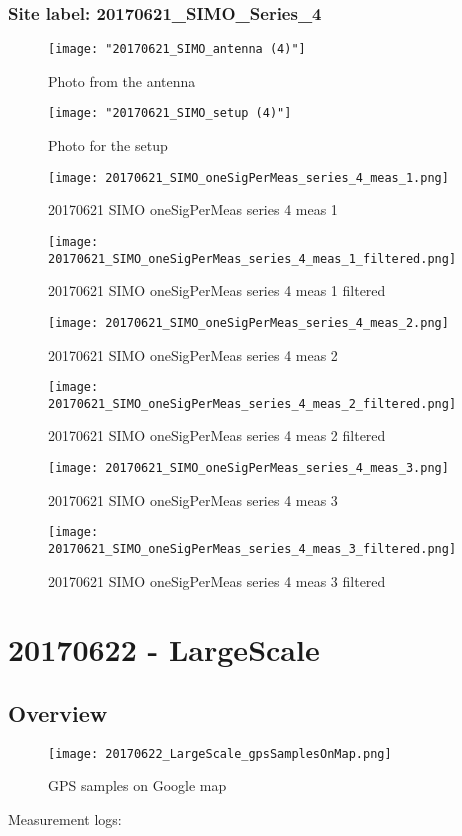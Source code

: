 \subsubsection{Site label: 20170621\_SIMO\_Series\_4}
\begin{figure}[ht] \caption{Photo from the antenna}
\texttt{[image: "20170621\_SIMO\_antenna (4)"]}\centering\end{figure}
\begin{figure}[ht] \caption{Photo for the setup}
\texttt{[image: "20170621\_SIMO\_setup (4)"]}\centering\end{figure}
\begin{figure}[ht] \caption{20170621 SIMO oneSigPerMeas series 4 meas 1}
\texttt{[image: 20170621\_SIMO\_oneSigPerMeas\_series\_4\_meas\_1.png]}\centering\end{figure}
\begin{figure}[ht] \caption{20170621 SIMO oneSigPerMeas series 4 meas 1 filtered}
\texttt{[image: 20170621\_SIMO\_oneSigPerMeas\_series\_4\_meas\_1\_filtered.png]}\centering\end{figure}
\begin{figure}[ht] \caption{20170621 SIMO oneSigPerMeas series 4 meas 2}
\texttt{[image: 20170621\_SIMO\_oneSigPerMeas\_series\_4\_meas\_2.png]}\centering\end{figure}
\begin{figure}[ht] \caption{20170621 SIMO oneSigPerMeas series 4 meas 2 filtered}
\texttt{[image: 20170621\_SIMO\_oneSigPerMeas\_series\_4\_meas\_2\_filtered.png]}\centering\end{figure}
\begin{figure}[ht] \caption{20170621 SIMO oneSigPerMeas series 4 meas 3}
\texttt{[image: 20170621\_SIMO\_oneSigPerMeas\_series\_4\_meas\_3.png]}\centering\end{figure}
\begin{figure}[ht] \caption{20170621 SIMO oneSigPerMeas series 4 meas 3 filtered}
\texttt{[image: 20170621\_SIMO\_oneSigPerMeas\_series\_4\_meas\_3\_filtered.png]}\centering\end{figure}
\clearpage
\section{20170622 - LargeScale}
\subsection{Overview}
\begin{figure}[ht] \caption{GPS samples on Google map}
\texttt{[image: 20170622\_LargeScale\_gpsSamplesOnMap.png]}\centering\end{figure}
\begin{minipage}{\textwidth} Measurement logs:

 \end{minipage}
\clearpage
